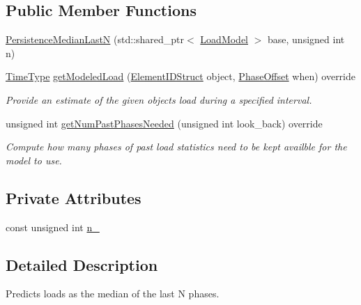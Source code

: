 \subsection*{Public Member Functions}
\begin{DoxyCompactItemize}
\item 
\hyperlink{structvt_1_1vrt_1_1collection_1_1balance_1_1_persistence_median_last_n_afeb915b217785638e82918d6f2b23d8b}{Persistence\+Median\+LastN} (std\+::shared\+\_\+ptr$<$ \hyperlink{structvt_1_1vrt_1_1collection_1_1balance_1_1_load_model}{Load\+Model} $>$ base, unsigned int n)
\item 
\hyperlink{namespacevt_a876a9d0cd5a952859c72de8a46881442}{Time\+Type} \hyperlink{structvt_1_1vrt_1_1collection_1_1balance_1_1_persistence_median_last_n_a1b0104c6ab1a7a3906937b0dc82be5f8}{get\+Modeled\+Load} (\hyperlink{namespacevt_1_1vrt_1_1collection_1_1balance_a9f5b53fafb270212279a4757d2c4cd28}{Element\+I\+D\+Struct} object, \hyperlink{structvt_1_1vrt_1_1collection_1_1balance_1_1_phase_offset}{Phase\+Offset} when) override
\begin{DoxyCompactList}\small\item\em Provide an estimate of the given object\textquotesingle{}s load during a specified interval. \end{DoxyCompactList}\item 
unsigned int \hyperlink{structvt_1_1vrt_1_1collection_1_1balance_1_1_persistence_median_last_n_accad4d2fe2cc3701966e13bbb5dd793c}{get\+Num\+Past\+Phases\+Needed} (unsigned int look\+\_\+back) override
\begin{DoxyCompactList}\small\item\em Compute how many phases of past load statistics need to be kept availble for the model to use. \end{DoxyCompactList}\end{DoxyCompactItemize}
\subsection*{Private Attributes}
\begin{DoxyCompactItemize}
\item 
const unsigned int \hyperlink{structvt_1_1vrt_1_1collection_1_1balance_1_1_persistence_median_last_n_aa800c86e610ba7b4ff0ddf0c91210136}{n\+\_\+}
\end{DoxyCompactItemize}


\subsection{Detailed Description}
Predicts loads as the median of the last N phases. 

